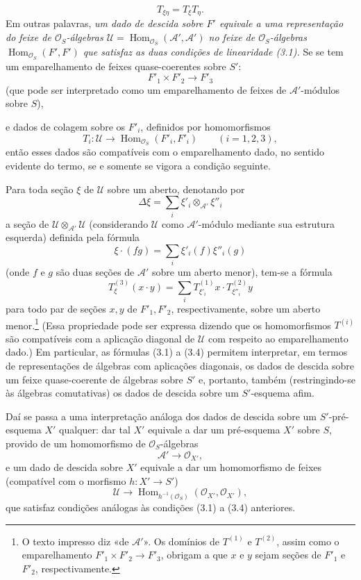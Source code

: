 \begin{equation}
  T_{\xi\eta}=T_\xi T_\eta.
  \tag{3.3}
\end{equation}
Em outras palavras, \emph{um dado de descida sobre $F'$ equivale a uma
representação do feixe de $\mathcal O_S$-álgebras
$\mathcal U=\operatorname{Hom}_{\mathcal O_S}(\mathcal A',\mathcal A')$ no
feixe de $\mathcal O_S$-álgebras
$\operatorname{Hom}_{\mathcal O_S}(F',F')$ que satisfaz as duas condições de
linearidade (3.1).} Se se tem um emparelhamento de feixes quase-coerentes sobre
$S'$:
\[
  F'_1\times F'_2\longrightarrow F'_3
\]
(que pode ser interpretado como um emparelhamento de feixes de
$\mathcal A'$-módulos sobre $S$),

e dados de colagem sobre os $F'_i$, definidos por homomorfismos
\[
  T_i:\mathcal U\longrightarrow
  \operatorname{Hom}_{\mathcal O_S}(F'_i,F'_i)
  \qquad (i=1,2,3),
\]
então esses dados são compatíveis com o emparelhamento dado, no sentido
evidente do termo, se e somente se vigora a condição seguinte.

Para toda seção $\xi$ de $\mathcal U$ sobre um aberto, denotando por
\[
  \Delta\xi=\sum_i\xi'_i\otimes_{\mathcal A'}\xi''_i
\]
a seção de $\mathcal U\otimes_{\mathcal A'}\mathcal U$ (considerando
$\mathcal U$ como $\mathcal A'$-módulo mediante sua estrutura esquerda)
definida pela fórmula
\[
  \xi\mathbin{\cdot}(fg)=\sum_i\xi'_i(f)\xi''_i(g)
\]
(onde $f$ e $g$ são duas seções de $\mathcal A'$ sobre um aberto menor),
tem-se a fórmula
\begin{equation}
  T^{(3)}_\xi(x\mathbin{\cdot}y)
  =\sum_iT^{(1)}_{\xi'_i}x\mathbin{\cdot}T^{(2)}_{\xi''_i}y
  \tag{3.4}
\end{equation}
para todo par de seções $x,y$ de $F'_1,F'_2$, respectivamente, sobre um
aberto menor.\footnote{O texto impresso diz «de $\mathcal A'$». Os domínios de
$T^{(1)}$ e $T^{(2)}$, assim como o emparelhamento
$F'_1\times F'_2\longrightarrow F'_3$, obrigam a que $x$ e $y$ sejam seções
de $F'_1$ e $F'_2$, respectivamente.} (Essa propriedade pode ser expressa
dizendo que os homomorfismos $T^{(i)}$ são compatíveis com a aplicação
diagonal de $\mathcal U$ com respeito ao emparelhamento dado.) Em particular, as
fórmulas (3.1) a (3.4) permitem interpretar, em termos de representações de
álgebras com aplicações diagonais, os dados de descida sobre um feixe
quase-coerente de álgebras sobre $S'$ e, portanto, também (restringindo-se às
álgebras comutativas) os dados de descida sobre um $S'$-esquema afim.

Daí se passa a uma interpretação análoga dos dados de descida sobre um
$S'$-pré-esquema $X'$ qualquer: dar tal $X'$ equivale a dar um pré-esquema
$X'$ sobre $S$, provido de um homomorfismo de $\mathcal O_S$-álgebras
\[
  \mathcal A'\longrightarrow\mathcal O_{X'},
\]
e um dado de descida sobre $X'$ equivale a dar um homomorfismo de feixes
(compatível com o morfismo $h:X'\longrightarrow S'$)
\[
  \mathcal U\longrightarrow
  \operatorname{Hom}_{h^{-1}(\mathcal O_S)}
  (\mathcal O_{X'},\mathcal O_{X'}),
\]
que satisfaz condições análogas às condições (3.1) a (3.4) anteriores.

